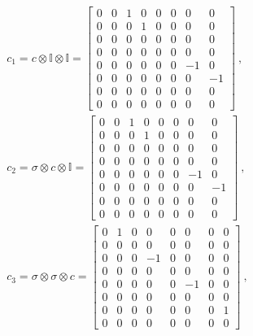\documentclass[reprint]{revtex4-2}
\begin{document}
\begin{equation*}\begin{aligned}
	c_1 = c \otimes \mathbb{I} \otimes \mathbb{I} = \begin{bmatrix}
0 & 0 & 1 & 0 & 0 & 0 &  0 &  0 \\
0 & 0 & 0 & 1 & 0 & 0 &  0 &  0 \\
0 & 0 & 0 & 0 & 0 & 0 &  0 &  0 \\
0 & 0 & 0 & 0 & 0 & 0 &  0 &  0 \\
0 & 0 & 0 & 0 & 0 & 0 & -1 &  0 \\
0 & 0 & 0 & 0 & 0 & 0 &  0 & -1 \\
0 & 0 & 0 & 0 & 0 & 0 &  0 &  0 \\
0 & 0 & 0 & 0 & 0 & 0 &  0 &  0 
\end{bmatrix}~,\\
	c_2 = \sigma \otimes c \otimes \mathbb{I} = \begin{bmatrix}
0 & 0 & 1 & 0 & 0 & 0 &  0 &  0 \\
 0 & 0 & 0 & 1 & 0 & 0 &  0 &  0 \\
 0 & 0 & 0 & 0 & 0 & 0 &  0 &  0 \\
 0 & 0 & 0 & 0 & 0 & 0 &  0 &  0 \\
 0 & 0 & 0 & 0 & 0 & 0 & -1 &  0 \\
 0 & 0 & 0 & 0 & 0 & 0 &  0 & -1 \\
 0 & 0 & 0 & 0 & 0 & 0 &  0 &  0 \\
 0 & 0 & 0 & 0 & 0 & 0 &  0 &  0 
\end{bmatrix}~,\\
		c_3 = \sigma \otimes \sigma \otimes c = \begin{bmatrix}
	0 & 1 & 0 &  0 & 0 &  0 & 0 & 0 \\
	0 & 0 & 0 &  0 & 0 &  0 & 0 & 0 \\
	0 & 0 & 0 & -1 & 0 &  0 & 0 & 0 \\
	0 & 0 & 0 &  0 & 0 &  0 & 0 & 0 \\
	0 & 0 & 0 &  0 & 0 & -1 & 0 & 0 \\
	0 & 0 & 0 &  0 & 0 &  0 & 0 & 0 \\
	0 & 0 & 0 &  0 & 0 &  0 & 0 & 1 \\
	0 & 0 & 0 &  0 & 0 &  0 & 0 & 0 
\end{bmatrix}~,\\
\end{aligned}\end{equation*}
\end{document}
